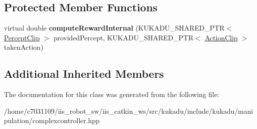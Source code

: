 \subsection*{Protected Member Functions}
\begin{DoxyCompactItemize}
\item 
\hypertarget{classkukadu_1_1EnvironmentReward_add69df93b12c6e217570b1b736d959e7}{virtual double {\bfseries compute\-Reward\-Internal} (K\-U\-K\-A\-D\-U\-\_\-\-S\-H\-A\-R\-E\-D\-\_\-\-P\-T\-R$<$ \hyperlink{classkukadu_1_1PerceptClip}{Percept\-Clip} $>$ provided\-Percept, K\-U\-K\-A\-D\-U\-\_\-\-S\-H\-A\-R\-E\-D\-\_\-\-P\-T\-R$<$ \hyperlink{classkukadu_1_1ActionClip}{Action\-Clip} $>$ taken\-Action)}\label{classkukadu_1_1EnvironmentReward_add69df93b12c6e217570b1b736d959e7}

\end{DoxyCompactItemize}
\subsection*{Additional Inherited Members}


The documentation for this class was generated from the following file\-:\begin{DoxyCompactItemize}
\item 
/home/c7031109/iis\-\_\-robot\-\_\-sw/iis\-\_\-catkin\-\_\-ws/src/kukadu/include/kukadu/manipulation/complexcontroller.\-hpp\end{DoxyCompactItemize}
